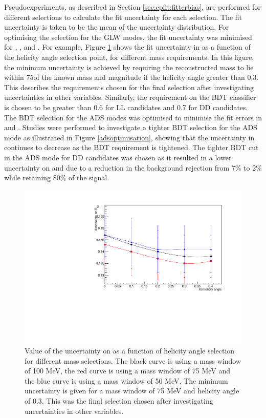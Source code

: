 Pseudoexperiments, as described in Section \ref{sec:cpfit:fitterbias}, are performed for different selections to calculate the fit uncertainty for each selection. The fit uncertainty is taken to be the mean of the uncertainty distribution. For optimising the selection for the GLW modes, the fit uncertainty was minimised for \Akk, \Rkk, \Apipi and \Rpipi. For example, Figure \ref{optimisation} shows the fit uncertainty in \Rkk as a function of the \KS helicity angle selection point, for different \Kstar mass requirements. In this figure, the minimum uncertainty is achieved by requiring the reconstructed \Kstar mass to lie within 75\mevcc of the known \Kstar mass and magnitude if the \KS helicity angle greater than 0.3. This describes the \Kstar requirements chosen for the final selection after investigating uncertainties in other variables. Similarly, the requirement on the BDT classifier is chosen to be greater than 0.6 for LL candidates and 0.7 for DD candidates. The BDT selection for the ADS modes was optimised to minimise the fit errors in \Rptwo and \Rmtwo. Studies were performed to investigate a tighter BDT selection for the ADS mode as illustrated in Figure \ref{adsoptimisation}, showing that the uncertainty in \Rptwo continues to decrease as the BDT requirement is tightened. The tighter BDT cut in the ADS mode for DD candidates was chosen as it resulted in a lower uncertainty on \Rptwo and \Rmtwo due to a reduction in the background rejection from 7\% to 2\% while retaining 80\% of the signal. 

\begin{figure}
\centering
\includegraphics[width=0.8\linewidth]{figures/selection/optimisation.pdf}
\caption{Value of the uncertainty on \Rkk as a function of \KS helicity angle selection for different \Kstar mass selections. The black curve is using a \Kstar mass window of 100 MeV, the red curve is using a \Kstar mass window of 75 MeV and the blue curve is using a \Kstar mass window of 50 MeV. The minimum uncertainty is given for a \Kstar mass window of 75 MeV and \KS helicity angle of 0.3. This was the final \Kstar selection chosen after investigating uncertainties in other variables.}
\label{optimisation}
\end{figure}

